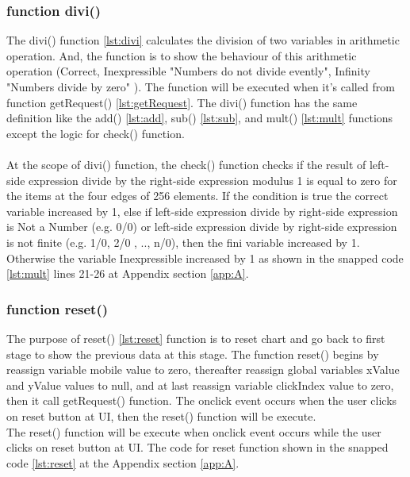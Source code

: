\documentclass[11pt]{article}
\begin{document}
\subsubsection{function divi()}
The divi() function \ref{lst:divi} calculates the division of two variables in arithmetic operation. And, the function is to show the behaviour of this arithmetic operation (Correct, Inexpressible "Numbers do not divide evently", Infinity "Numbers divide by zero" ). The function will be executed when it's called from function getRequest() \ref{lst:getRequest}. The divi() function has the same definition like the add() \ref{lst:add}, sub() \ref{lst:sub}, and mult() \ref{lst:mult} functions except the logic for check() function.\\
\\At the scope of divi() function, the check() function checks if the result of left-side expression divide by the right-side expression modulus 1 is equal to zero for the items at the four edges of 256 elements. If the condition is true the correct variable increased by 1, else if left-side  expression divide by right-side expression is Not a Number (e.g. 0/0) or left-side expression divide by right-side expression is not finite (e.g. 1/0, 2/0 , .., n/0), then the fini variable increased by 1. Otherwise the variable Inexpressible increased by 1 as shown in the snapped code \ref{lst:mult} lines 21-26 at Appendix section \ref{app:A}.\\

\subsubsection{function reset()}
The purpose of reset() \ref{lst:reset} function is to reset chart and go back to first stage to show the previous data at this stage. The function reset() begins by reassign variable mobile value to zero, thereafter reassign global variables xValue and yValue values to null, and at last reassign variable clickIndex value to zero, then it call getRequest() function. The onclick event occurs when the user clicks on reset button at UI, then 
the reset() function will be execute.\\
The reset() function will be execute when onclick event occurs while the user clicks on reset button at UI. The code for reset function shown in the snapped code \ref{lst:reset} at the Appendix section \ref{app:A}.
\end{document}
